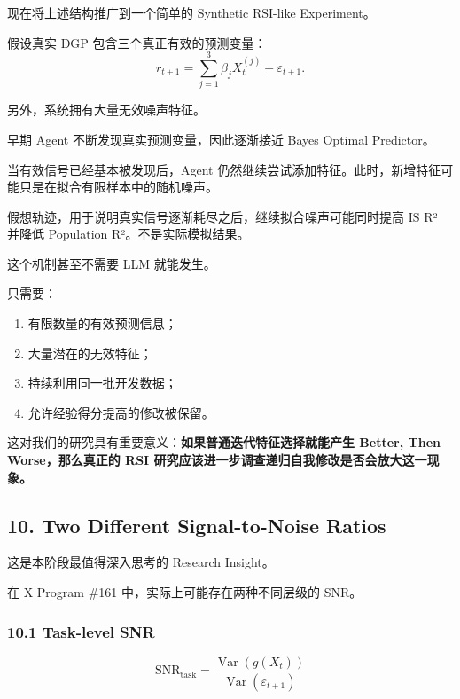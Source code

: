 现在将上述结构推广到一个简单的 Synthetic RSI-like Experiment。

假设真实 DGP 包含三个真正有效的预测变量：
\[r_{t+1}
=
\sum_{j=1}^{3}\beta_jX_t^{(j)}
+\varepsilon_{t+1}.\]

另外，系统拥有大量无效噪声特征。

早期 Agent 不断发现真实预测变量，因此逐渐接近 Bayes Optimal Predictor。

当有效信号已经基本被发现后，Agent 仍然继续尝试添加特征。此时，新增特征可能只是在拟合有限样本中的随机噪声。


假想轨迹，用于说明真实信号逐渐耗尽之后，继续拟合噪声可能同时提高 IS R² 并降低 Population R²。不是实际模拟结果。

这个机制甚至不需要 LLM 就能发生。

只需要：

\begin{enumerate}
\def\labelenumi{\arabic{enumi}.}
\tightlist
\item
  有限数量的有效预测信息；
\item
  大量潜在的无效特征；
\item
  持续利用同一批开发数据；
\item
  允许经验得分提高的修改被保留。
\end{enumerate}

这对我们的研究具有重要意义：\textbf{如果普通迭代特征选择就能产生 Better, Then Worse，那么真正的 RSI 研究应该进一步调查递归自我修改是否会放大这一现象。}

\hypertarget{part-4-60-0001-two-different-signal-to-noise-ratios}{%
\subsection{10. Two Different Signal-to-Noise Ratios}\label{part-4-60-0001-two-different-signal-to-noise-ratios}}

这是本阶段最值得深入思考的 Research Insight。

在 X Program \#161 中，实际上可能存在两种不同层级的 SNR。

\hypertarget{part-4-60-0001-task-level-snr}{%
\subsubsection{10.1 Task-level SNR}\label{part-4-60-0001-task-level-snr}}

\[\boxed{
\mathrm{SNR}_{\mathrm{task}}
=
\frac{\operatorname{Var}(g(X_t))}
{\operatorname{Var}(\varepsilon_{t+1})}
}\]

